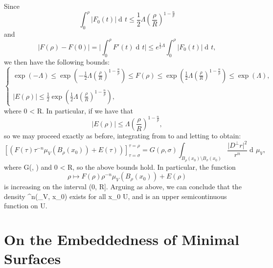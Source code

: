 \documentclass[a4paper, 11pt]{article}
\theoremstyle{plain}
\theoremstyle{definition}
\theoremstyle{remark}
\DeclareMathOperator{\diff}{d \!}
\numberwithin{equation}{subsection}
\def\({}
\def\){}
\begin{document}
Since 
\begin{equation}
\int_{0}^{\rho}\vert F_{0}(t)\vert \diff t \leqslant \frac{1}{2}\Lambda\left(\frac{\rho}{R}\right)^{1-\frac{n}{p}}
\end{equation}
and 
\begin{equation}
\vert F(\rho) - F(0)\vert = \bigg\vert \int_{0}^{\rho}F'(t)\diff t\bigg\vert \leqslant e^{\frac{1}{2}\Lambda}\int_{0}^{\rho}\vert F_{0}(t) \vert \diff t,
\end{equation}
we then have the following bounds:
\begin{equation}
\begin{cases}
\exp(-\Lambda) \leqslant \exp\left(-\frac{1}{2}\Lambda\left(\frac{\rho}{R}\right)^{1-\frac{n}{p}}\right) \leqslant F(\rho) \leqslant \exp\left(\frac{1}{2}\Lambda\left(\frac{\rho}{R}\right)^{1-\frac{n}{p}}\right) \leqslant \exp(\Lambda), \\
\\
\vert E(\rho)\vert \leqslant \frac{1}{2}\exp\left(\frac{1}{2}\Lambda\left(\frac{\rho}{R}\right)^{1-\frac{n}{p}}\right),
\end{cases}
\end{equation}
where \(0 < \rho \leqslant R\). In particular, if \(\Lambda {}\) we have that
\begin{equation}
\vert E(\rho) \vert \leqslant \Lambda\left(\frac{\rho}{R}\right)^{1-\frac{n}{p}},
\end{equation}
so we may proceed exactly as before, integrating from \(\rho\) to \(\sigma\) and letting \(\varepsilon {}\) to obtain:
\begin{equation}
\left[\left(F(\tau)\tau^{-n}\mu_{V}(B_{\rho}(x_{0})) + E(\tau)\right)\right]_{\tau = \sigma}^{\tau = \rho} = G(\rho,\sigma) \int_{B_{\rho}(x_{0}) \setminus B_{\sigma}(x_{0})} \frac{\vert D^{\perp}r\vert^{2}}{r^{n}}\diff \mu_{V},
\end{equation}
where \(G(\rho, \sigma) \) and \(0 < \sigma \leqslant \rho \leqslant R\), so the above bounds hold. In particular, the function
\begin{equation}
\rho \longmapsto\!F(\rho)\rho^{-n}\mu_{V}(B_{\rho}(x_0)) + E(\rho)
\end{equation}
is increasing on the interval \((0, R]\). Arguing as above, we can conclude that the density \(\Theta^{n}(\mu_{V}, x_{0})\) exists for all \(x_{0} \in U\), and is an upper semicontinuous function on \(U\).

\section{On the Embeddedness of Minimal Surfaces}
\label{Paper}
\end{document}
